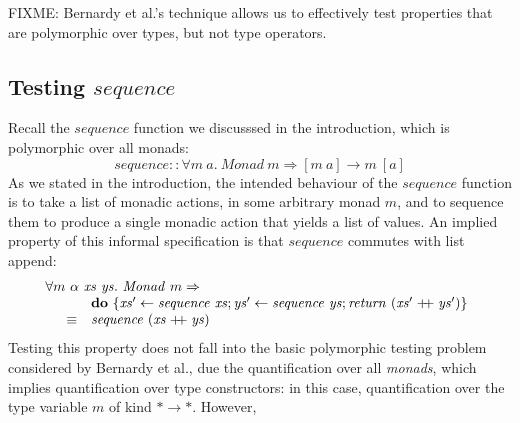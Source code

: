 \documentclass{llncs}
\newcommand{\listappend}{\mathrel{+\kern-3pt+}}
\begin{document}

FIXME: Bernardy et al.'s technique allows us to effectively test
properties that are polymorphic over types, but not type operators.

\subsection{Testing $\mathit{sequence}$}

Recall the $\mathit{sequence}$ function we discusssed in the
introduction, which is polymorphic over all monads:
\begin{displaymath}
  \mathit{sequence} :: \forall m~a.~\mathit{Monad}~m \Rightarrow [m~a] \to m~[a]
\end{displaymath}
As we stated in the introduction, the intended behaviour of the
$\mathit{sequence}$ function is to take a list of monadic actions, in
some arbitrary monad $m$, and to sequence them to produce a single
monadic action that yields a list of values. An implied property of
this informal specification is that $\mathit{sequence}$ commutes with
list append:
\begin{equation}\label{eq:sequence-append}
  \begin{array}{l}
    \forall m~\alpha~\mathit{xs}~\mathit{ys}.~\mathit{Monad}~m \Rightarrow \\
    \quad
    \begin{array}{cl}
      &\mathbf{do}~\{\mathit{xs'} \leftarrow \mathit{sequence}~\mathit{xs}; \mathit{ys'} \leftarrow \mathit{sequence}~\mathit{ys}; \mathit{return}~(\mathit{xs'}\listappend\mathit{ys'}) \} \\
      \equiv&\mathit{sequence}~(\mathit{xs}\listappend\mathit{ys})
    \end{array}
  \end{array}
\end{equation}
Testing this property does not fall into the basic polymorphic testing
problem considered by Bernardy et al., due the quantification over all
\emph{monads}, which implies quantification over type constructors: in
this case, quantification over the type variable $m$ of kind
$* \to *$. However, 
\end{document}
